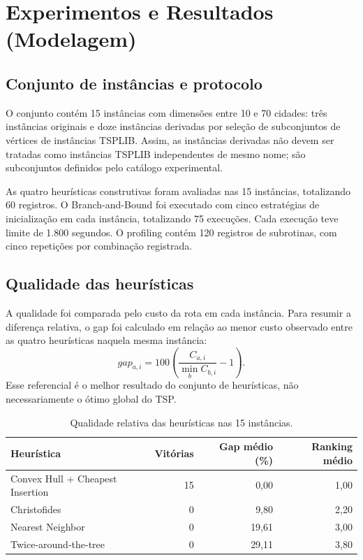 \documentclass[12pt]{article}
\begin{document}
\section{Experimentos e Resultados (Modelagem)}

\subsection{Conjunto de instâncias e protocolo}

O conjunto contém 15 instâncias com dimensões entre 10 e 70 cidades: três instâncias originais e doze instâncias derivadas por seleção de subconjuntos de vértices de instâncias TSPLIB. Assim, as instâncias derivadas não devem ser tratadas como instâncias TSPLIB independentes de mesmo nome; são subconjuntos definidos pelo catálogo experimental.

As quatro heurísticas construtivas foram avaliadas nas 15 instâncias, totalizando 60 registros. O Branch-and-Bound foi executado com cinco estratégias de inicialização em cada instância, totalizando 75 execuções. Cada execução teve limite de 1.800 segundos. O profiling contém 120 registros de subrotinas, com cinco repetições por combinação registrada.

\subsection{Qualidade das heurísticas}

A qualidade foi comparada pelo custo da rota em cada instância. Para resumir a diferença relativa, o gap foi calculado em relação ao menor custo observado entre as quatro heurísticas naquela mesma instância:
\[
gap_{a,i} = 100\left(\frac{C_{a,i}}{\min_b C_{b,i}}-1\right).
\]
Esse referencial é o melhor resultado do conjunto de heurísticas, não necessariamente o ótimo global do TSP.

\begin{table}[H]
\centering
\caption{Qualidade relativa das heurísticas nas 15 instâncias.}
\label{tab:qualidade}
\begin{tabular}{lrrr}
\toprule
Heurística & Vitórias & Gap médio (\%) & Ranking médio\\
\midrule
Convex Hull + Cheapest Insertion & 15 & 0,00 & 1,00\\
Christofides & 0 & 9,80 & 2,20\\
Nearest Neighbor & 0 & 19,61 & 3,00\\
Twice-around-the-tree & 0 & 29,11 & 3,80\\
\bottomrule
\end{tabular}
\end{table}
\end{document}
